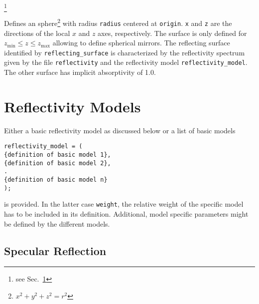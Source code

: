 \documentclass[10pt,a4paper,titlepage]{article}
\begin{document}









\footnote{see Sec.~\ref{sec:refl_models}}


\vspace{0.25cm}
Defines an sphere\footnote{${x^2}+{y^2}+{z^2}={r^2}$} with radius {\tt radius} centered at {\tt origin}. {\tt x} and {\tt z} are the directions of the local $x$ and $z$ axes, respectively. The surface is only defined for $z_\mathrm{min} \leq z \leq z_\mathrm{max}$ allowing to define spherical mirrors. The reflecting surface identified by {\tt reflecting\_surface} is characterized by the reflectivity spectrum given by the file {\tt reflectivity} and the reflectivity model {\tt reflectivity\_model}. The other surface has implicit absorptivity of 1.0.



\section{Reflectivity Models} \label{sec:refl_models}

Either a basic reflectivity model as discussed below or a list of basic models

\begin{verbatim}
reflectivity_model = (
{definition of basic model 1}, 
{definition of basic model 2}, 
.
{definition of basic model n}
);
\end{verbatim}

\noindent is provided. In the latter case {\tt weight}, the relative weight of the specific model has to be included in its definition. Additional, model specific parameters might be defined by the different models.

\subsection{Specular Reflection}
\end{document}

